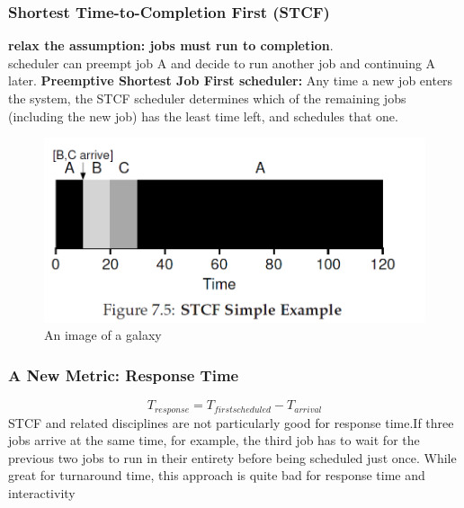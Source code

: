 \documentclass{article}
\begin{document}
\subsubsection{Shortest Time-to-Completion First (STCF)}
\textbf{relax the assumption: jobs must
run to completion}.\\
scheduler can preempt job A and decide to run another job and continuing A later.
\textbf{\color{red} Preemptive Shortest Job First scheduler: }Any time a new
job enters the system, the STCF scheduler determines which of the remaining
jobs (including the new job) has the least time left, and schedules
that one.
\begin{figure}[H]
    \centering
    \includegraphics[width=13cm] {fig7.5.png}
    \caption{An image of a galaxy}
    \label{fig:galaxy}
\end{figure}

\subsubsection{A New Metric: Response Time}
$$T_{response}=T_{firstscheduled}-T_{arrival}$$
{\color{red}STCF and related disciplines are not particularly
good for response time.}If three jobs arrive at the same time,
for example, the third job has to wait for the previous two jobs to run in their entirety before being scheduled just once. While great for turnaround time, this approach is quite bad for response time and interactivity
\end{document}
